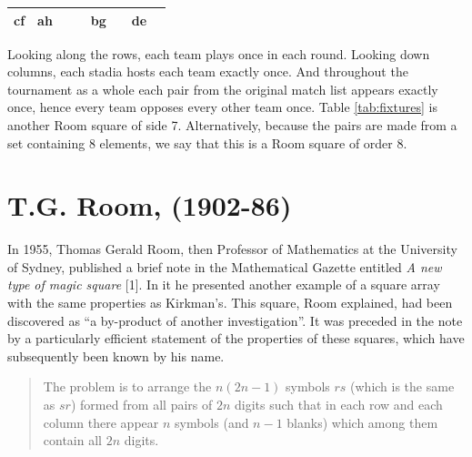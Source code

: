 \documentclass[
  12pt,
  a4paper]{book}
\begin{document}
\begin{longtable}[]{@{}cccccccc@{}}
\begin{minipage}[t]{0.05\columnwidth}
cf\strut
\end{minipage} & \begin{minipage}[t]{0.05\columnwidth}\centering
ah\strut
\end{minipage} & \begin{minipage}[t]{0.05\columnwidth}\centering
\strut
\end{minipage} & \begin{minipage}[t]{0.05\columnwidth}\centering
\strut
\end{minipage} & \begin{minipage}[t]{0.05\columnwidth}\centering
bg\strut
\end{minipage} & \begin{minipage}[t]{0.05\columnwidth}\centering
\strut
\end{minipage} & \begin{minipage}[t]{0.05\columnwidth}\centering
de\strut
\end{minipage}\tabularnewline
\bottomrule
\end{longtable}

Looking along the rows, each team plays once in each round. Looking down
columns, each stadia hosts each team exactly once. And throughout the
tournament as a whole each pair from the original match list appears
exactly once, hence every team opposes every other team once. Table
\ref{tab:fixtures}
is another Room square of side 7. Alternatively, because the pairs are
made from a set containing 8 elements, we say that this is a Room square
of order 8.

\hypertarget{t.g.-room-1902-86}{%
\section{T.G. Room, (1902-86)}\label{t.g.-room-1902-86}}

In 1955, Thomas Gerald Room, then Professor of Mathematics at the
University of Sydney, published a brief note in the Mathematical Gazette
entitled \emph{A new type of magic square}
{[}1{]}.
In it he presented another
example of a square array with the same properties as Kirkman's. This
square, Room explained, had been discovered as ``a by-product of
another investigation''. It was preceded in the note by a particularly
efficient statement of the properties of these squares, which have
subsequently been known by his name.

\begin{quote}
The problem is to arrange the \(n(2n-1)\) symbols \(rs\) (which is the
same as \(sr\)) formed from all pairs of \(2n\) digits such that in each
row and each column there appear \(n\) symbols (and \(n-1\) blanks) which
among them contain all \(2n\) digits.
\end{quote}
\end{document}
